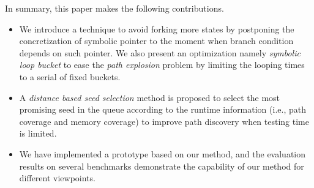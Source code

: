 In summary, this paper makes the following contributions.
\begin{itemize}
\item We introduce a technique to avoid forking more states by postponing the concretization of symbolic pointer to the moment when branch condition depends on such pointer.  
 We also present an optimization namely \emph{symbolic loop bucket} to ease the \textit{path explosion} problem by limiting the looping times to a serial of fixed buckets.

\item A \emph{distance based seed selection} method is proposed to select the most promising seed 
 in the queue according to the runtime information (i.e., path coverage and memory coverage) to improve path discovery when testing time is limited. 

\item We have implemented a prototype based on our method, 
 and the evaluation results on several benchmarks demonstrate the capability of our method for different viewpoints.
\end{itemize}


